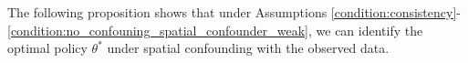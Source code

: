 \documentclass[12pt]{article}
\begin{document}
The following proposition shows that under Assumptions \ref{condition:consistency}- \ref{condition:no_confouning_spatial_confounder_weak}, we can identify the optimal policy $\theta^*$ under spatial confounding with the observed data.
\end{document}
